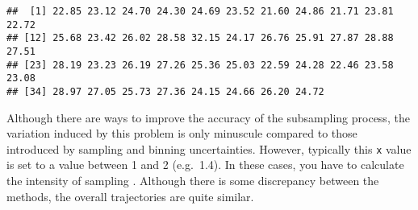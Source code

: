 \documentclass[]{article}
\begin{document}
\begin{verbatim}
##  [1] 22.85 23.12 24.70 24.30 24.69 23.52 21.60 24.86 21.71 23.81 22.72
## [12] 25.68 23.42 26.02 28.58 32.15 24.17 26.76 25.91 27.87 28.88 27.51
## [23] 28.19 23.23 26.19 27.26 25.36 25.03 22.59 24.28 22.46 23.58 23.08
## [34] 28.97 27.05 25.73 27.36 24.15 24.66 26.20 24.72
\end{verbatim}

Although there are ways to improve the accuracy of the subsampling
process, the variation induced by this problem is only minuscule
compared to those introduced by sampling and binning uncertainties.
However, typically this \texttt{x} value is set to a value between 1 and
2 (e.g.~1.4). In these cases, you have to calculate the intensity of
sampling . Although there is some discrepancy between the methods, the
overall trajectories are quite similar.
\end{document}
